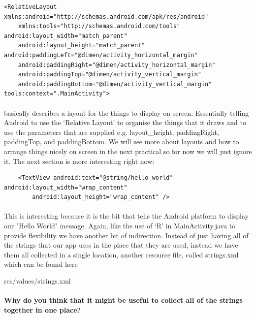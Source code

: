 \begin{lstlisting}<RelativeLayout xmlns:android="http://schemas.android.com/apk/res/android"
    xmlns:tools="http://schemas.android.com/tools" android:layout_width="match_parent"
    android:layout_height="match_parent" android:paddingLeft="@dimen/activity_horizontal_margin"
    android:paddingRight="@dimen/activity_horizontal_margin"
    android:paddingTop="@dimen/activity_vertical_margin"
    android:paddingBottom="@dimen/activity_vertical_margin" tools:context=".MainActivity">
\end{lstlisting}

\paragraph{} basically describes a layout for the things to display on screen. Essentially telling Android to use the `Relative Layout' to organise the things that it draws and to use the parameters that are supplied e.g. layout\_height, paddingRight, paddingTop, and paddingBottom. We will see more about layouts and how to arrange things nicely on screen in the next practical so for now we will just ignore it. The next section is more interesting right now:

\begin{lstlisting}    <TextView android:text="@string/hello_world" android:layout_width="wrap_content"
        android:layout_height="wrap_content" />
\end{lstlisting}

\paragraph{} This is interesting because it is the bit that tells the Android platform to display our "Hello World" message. Again, like the use of `R' in MainActivity.java to provide flexibility we have another bit of indirection. Instead of just having all of the strings that our app uses in the place that they are used, instead we have them all collected in a single location, another resource file, called strings.xml which can be found here

\begin{framed}
res/values/strings.xml
\end{framed}

\paragraph{} {\bf{Why do you think that it might be useful to collect all of the strings together in one place?}}


